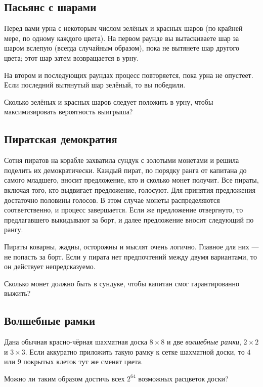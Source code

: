 \subsection*{Пасьянс с шарами}

Перед вами урна с некоторым числом зелёных и красных шаров (по крайней мере, по одному каждого цвета).
На первом раунде вы вытаскиваете шар за шаром вслепую (всегда случайным образом), пока не вытянете шар другого цвета; этот шар затем возвращается в урну.

На втором и последующих раундах процесс повторяется, пока урна не опустеет.
Если последний вытянутый шар зелёный, то вы победили.

Сколько зелёных и красных шаров следует положить в урну, чтобы максимизировать вероятность выигрыша?

\subsection*{Пиратская демократия}

Сотня пиратов на корабле захватила сундук с золотыми монетами и решила поделить их демократически.
Каждый пират, по порядку ранга от капитана до самого младшего, вносит предложение, кто и сколько монет получит.
Все пираты, включая того, кто выдвигает предложение, голосуют.
Для принятия предложения достаточно половины голосов.
В этом случае монеты распределяются соответственно, и процесс завершается.
Если же предложение отвергнуто, то предлагавшего выкидывают за борт, и далее предложение вносит следующий по рангу.

Пираты коварны, жадны, осторожны и мыслят очень логично.
Главное для них --- не попасть за борт.
Если у пирата нет предпочтений между двумя вариантами, то он действует непредсказуемо.

Сколько монет должно быть в сундуке, чтобы капитан смог гарантированно выжить?

\subsection*{Волшебные рамки}

Дана обычная красно-чёрная шахматная доска $8 \times 8$ и две \emph{волшебные рамки},  $2 \times 2$ и $3 \times 3$.
Если аккуратно приложить такую рамку к сетке шахматной доски, то $4$ или $9$ покрытых клеток тут же сменят цвета.

Можно ли таким образом достичь всех $2^{64}$ возможных расцветок доски?

